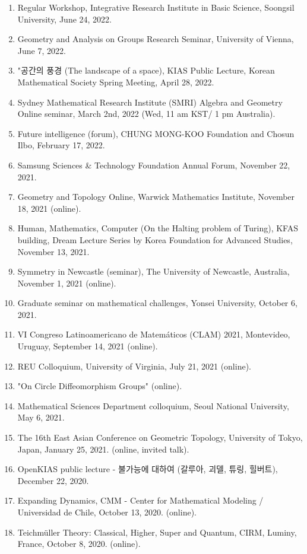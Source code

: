 \documentclass[11pt,a4paper]{article}
\begin{document}
\begin{enumerate}[leftmargin=1.5em, label=\arabic*.]
\item Regular Workshop, Integrative Research Institute in Basic Science, Soongsil University, June 24, 2022.
\item Geometry and Analysis on Groups Research Seminar, University of Vienna, June 7, 2022.
\item "공간의 풍경 (The landscape of a space), KIAS Public Lecture, Korean Mathematical Society Spring Meeting, April 28, 2022.
\item Sydney Mathematical Research Institute (SMRI) Algebra and Geometry Online seminar, March 2nd, 2022 (Wed, 11 am KST/ 1 pm Australia).
\item Future intelligence (forum), CHUNG MONG-KOO Foundation and Chosun Ilbo, February 17, 2022.
\item Samsung Sciences \& Technology Foundation Annual Forum, November 22, 2021.
\item Geometry and Topology Online, Warwick Mathematics Institute, November 18, 2021 (online).
\item Human, Mathematics, Computer (On the Halting problem of Turing), KFAS building, Dream Lecture Series by Korea Foundation for Advanced Studies, November 13, 2021.
\item Symmetry in Newcastle (seminar), The University of Newcastle, Australia, November 1, 2021 (online).
\item Graduate seminar on mathematical challenges, Yonsei University, October 6, 2021.
\item VI Congreso Latinoamericano de Matemáticos (CLAM) 2021, Montevideo, Uruguay, September 14, 2021 (online).
\item REU Colloquium, University of Virginia, July 21, 2021 (online).
\item "On Circle Diffeomorphism Groups" (online).
\item Mathematical Sciences Department colloquium, Seoul National University, May 6, 2021.
\item The 16th East Asian Conference on Geometric Topology, University of Tokyo, Japan, January 25, 2021. (online, invited talk).
\item OpenKIAS public lecture - 불가능에 대하여 (갈루아, 괴델, 튜링, 힐버트), December 22, 2020.
\item Expanding Dynamics, CMM - Center for Mathematical Modeling / Universidad de Chile, October 13, 2020. (online).
\item Teichmüller Theory: Classical, Higher, Super and Quantum, CIRM, Luminy, France, October 8, 2020. (online).

\end{enumerate}
\end{document}
